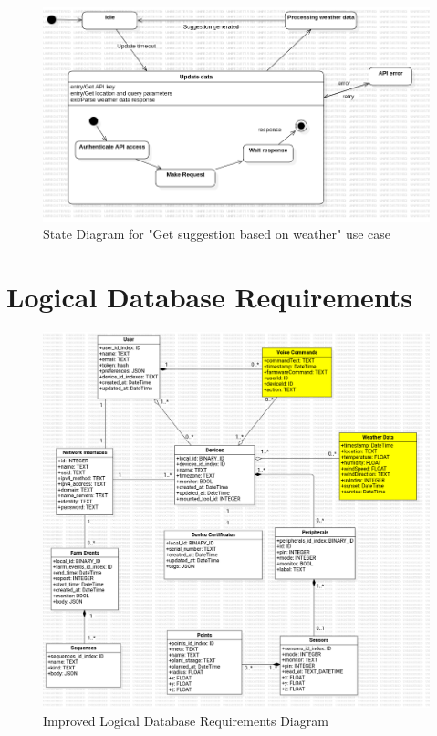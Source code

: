 \begin{figure}[H]
    \centering
    \includegraphics[width=1\textwidth]{UML Diagrams/StateDiagram_createsuggestions.png}
    \caption{State Diagram for "Get suggestion based on weather" use case}
    \label{fig:suggested_er}
\end{figure}

\section{Logical Database Requirements}

\begin{figure}[H]
    \centering
    \includegraphics[width=1\textwidth]{UML Diagrams/SuggestedDBDiagram.png}
    \caption{Improved Logical Database Requirements Diagram}
    \label{fig:suggested_er}
\end{figure}

